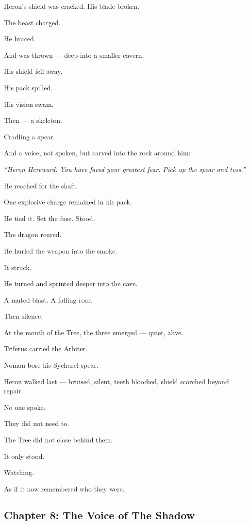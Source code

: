 \documentclass[12pt]{article}
\begin{document}
Heron’s shield was cracked. His blade broken.

The beast charged.

He braced.

And was thrown — deep into a smaller cavern.

His shield fell away.

His pack spilled.

His vision swam.

Then — a skeleton.

Cradling a spear.

And a voice, not spoken, but carved into the rock around him:

\textit{“Heron Hereward. You have faced your greatest fear. Pick up the spear and toss.”}

He reached for the shaft.

One explosive charge remained in his pack.

He tied it. Set the fuse. Stood.

The dragon roared.

He hurled the weapon into the smoke.

It struck.

He turned and sprinted deeper into the cave.

A muted blast. A falling roar.

Then silence.

\bigskip

At the mouth of the Tree, the three emerged — quiet, alive.

Triferus carried the Arbiter.

Noman bore his Sychurel spear.

Heron walked last — bruised, silent, teeth bloodied, shield scorched beyond repair.

No one spoke.

They did not need to.

The Tree did not close behind them.

It only stood.

Watching.

As if it now remembered who they were.


\newpage

\subsection{Chapter 8: The Voice of The Shadow}

\vspace{.5in}
\end{document}
